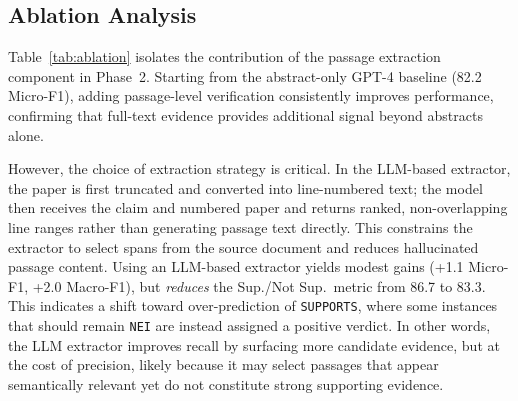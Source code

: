 \documentclass{article}
\theoremstyle{plain}
\theoremstyle{definition}
\theoremstyle{remark}
\begin{document}






\subsection{Ablation Analysis}
\label{sec:ablation}

Table~\ref{tab:ablation} isolates the contribution of the passage extraction component in Phase~2. Starting from the abstract-only GPT-4 baseline (82.2 Micro-F1), adding passage-level verification consistently improves performance, confirming that full-text evidence provides additional signal beyond abstracts alone.



However, the choice of extraction strategy is critical. In the LLM-based extractor, the paper is first truncated and converted into line-numbered text; the model then receives the claim and numbered paper and returns ranked, non-overlapping line ranges rather than generating passage text directly. This constrains the extractor to select spans from the source document and reduces hallucinated passage content. Using an LLM-based extractor yields modest gains (+1.1 Micro-F1, +2.0 Macro-F1), but \emph{reduces} the Sup./Not Sup.\ metric from 86.7 to 83.3. This indicates a shift toward over-prediction of \texttt{SUPPORTS}, where some instances that should remain \texttt{NEI} are instead assigned a positive verdict. In other words, the LLM extractor improves recall by surfacing more candidate evidence, but at the cost of precision, likely because it may select passages that appear semantically relevant yet do not constitute strong supporting evidence.
\end{document}
